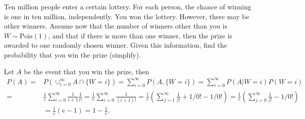 
\setcounter{theorem}{69}
\begin{exercise} [BH.4.70] Ten million people enter a certain lottery. For each person, the chance of winning is one in ten million, independently. You won the lottery. However, there may be other winners. Assume now that the number of winners other than you is $W \sim \text{Pois}(1)$, and that if there is more than one winner, then the prize is awarded to one randomly chosen winner. Given this information, find the probability that you win the prize (simplify).
\begin{solution}
    Let $A$ be the event that you win the prize, then
	\begin{align*}
		P(A)=& P(\cup_{i=0}^\infty A\cap \{W=i\})=\sum_{i=0}^\infty  P( A, \{W=i\})=\sum_{i=0}^\infty  P( A|W=i)P(W=i)\\
		=& \frac{1}{e} \sum_{i=0}^\infty \frac{1}{i+1}\frac{1}{i!} =\frac{1}{e} \sum_{i=0}^\infty \frac{1}{(i+1)!}=\frac{1}{e} (\sum_{j=1}^\infty \frac{1}{j!}+1/0!-1/0!)=\frac{1}{e} (\sum_{j=0}^\infty \frac{1}{j!}-1/0!)\\&=\frac{1}{e} (e-1)=1-\frac{1}{e}. 
	\end{align*}
\end{solution}
\end{exercise}

